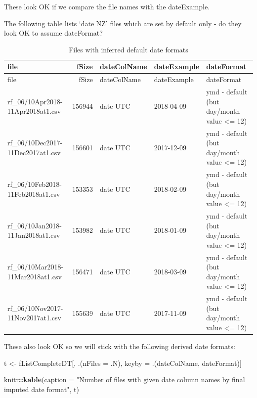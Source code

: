\documentclass[]{article}
\newenvironment{Shaded}{\begin{snugshade}}{\end{snugshade}}
\newcommand{\KeywordTok}[1]{\textcolor[rgb]{0.13,0.29,0.53}{\textbf{#1}}}
\newcommand{\DataTypeTok}[1]{\textcolor[rgb]{0.13,0.29,0.53}{#1}}
\newcommand{\StringTok}[1]{\textcolor[rgb]{0.31,0.60,0.02}{#1}}
\newcommand{\CommentTok}[1]{\textcolor[rgb]{0.56,0.35,0.01}{\textit{#1}}}
\newcommand{\OperatorTok}[1]{\textcolor[rgb]{0.81,0.36,0.00}{\textbf{#1}}}
\newcommand{\NormalTok}[1]{#1}
\begin{document}
These look OK if we compare the file names with the dateExample.

The following table lists `date NZ' files which are set by default only
- do they look OK to assume dateFormat?

\begin{Shaded}
\end{Shaded}

\begin{longtable}[]{@{}lrlll@{}}
\caption{Files with inferred default date formats}\tabularnewline
\toprule
file & fSize & dateColName & dateExample & dateFormat\tabularnewline
\midrule
\endfirsthead
\toprule
file & fSize & dateColName & dateExample & dateFormat\tabularnewline
\midrule
\endhead
rf\_06/10Apr2018-11Apr2018at1.csv & 156944 & date UTC & 2018-04-09 & ymd
- default (but day/month value \textless{}= 12)\tabularnewline
rf\_06/10Dec2017-11Dec2017at1.csv & 156601 & date UTC & 2017-12-09 & ymd
- default (but day/month value \textless{}= 12)\tabularnewline
rf\_06/10Feb2018-11Feb2018at1.csv & 153353 & date UTC & 2018-02-09 & ymd
- default (but day/month value \textless{}= 12)\tabularnewline
rf\_06/10Jan2018-11Jan2018at1.csv & 153982 & date UTC & 2018-01-09 & ymd
- default (but day/month value \textless{}= 12)\tabularnewline
rf\_06/10Mar2018-11Mar2018at1.csv & 156471 & date UTC & 2018-03-09 & ymd
- default (but day/month value \textless{}= 12)\tabularnewline
rf\_06/10Nov2017-11Nov2017at1.csv & 155639 & date UTC & 2017-11-09 & ymd
- default (but day/month value \textless{}= 12)\tabularnewline
\bottomrule
\end{longtable}

These also look OK so we will stick with the following derived date
formats:

\begin{Shaded}
\begin{Highlighting}[]
\NormalTok{t <-}\StringTok{ }\NormalTok{fListCompleteDT[, .(}\DataTypeTok{nFiles =}\NormalTok{ .N), keyby =}\StringTok{ }\NormalTok{.(dateColName, dateFormat)]}

\NormalTok{knitr}\OperatorTok{::}\KeywordTok{kable}\NormalTok{(}\DataTypeTok{caption =} \StringTok{"Number of files with given date column names by final imputed date format"}\NormalTok{, t)}
\end{Highlighting}
\end{Shaded}
\end{document}

